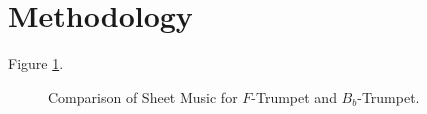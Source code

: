 \section{Methodology}\label{Sec: Methodology}

\lipsum[1]Figure \ref{fig: Brahms}.

\begin{figure}[htbp!]
    \centering
    \caption{Comparison of Sheet Music for $F$-Trumpet and $B_b$-Trumpet.}
    \label{fig: Brahms}
\end{figure}

\lipsum[2]